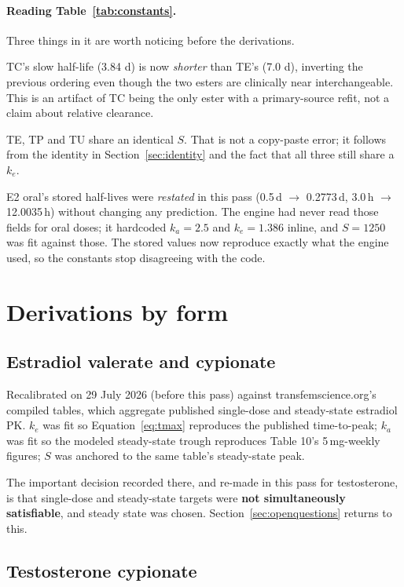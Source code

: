 \documentclass[11pt,a4paper]{article}
\begin{document}
\paragraph{Reading Table~\ref{tab:constants}.} Three things in it are worth
noticing before the derivations.

TC's slow half-life (3.84 d) is now \emph{shorter} than TE's (7.0 d), inverting
the previous ordering even though the two esters are clinically near
interchangeable. This is an artifact of TC being the only ester with a
primary-source refit, not a claim about relative clearance.

TE, TP and TU share an identical $S$. That is not a copy-paste error; it follows
from the identity in Section~\ref{sec:identity} and the fact that all three still
share a $k_e$.

E2 oral's stored half-lives were \emph{restated} in this pass (0.5\,d
$\to$ 0.2773\,d, 3.0\,h $\to$ 12.0035\,h) without changing any prediction. The
engine had never read those fields for oral doses; it hardcoded $k_a = 2.5$ and
$k_e = 1.386$ inline, and $S = 1250$ was fit against those. The stored values now
reproduce exactly what the engine used, so the constants stop disagreeing with the
code.

\section{Derivations by form}

\subsection{Estradiol valerate and cypionate}

Recalibrated on 29 July 2026 (before this pass) against
transfemscience.org's compiled tables, which aggregate published single-dose and
steady-state estradiol PK. $k_e$ was fit so Equation~\ref{eq:tmax} reproduces the
published time-to-peak; $k_a$ was fit so the modeled steady-state trough
reproduces Table 10's 5\,mg-weekly figures; $S$ was anchored to the same table's
steady-state peak.

The important decision recorded there, and re-made in this pass for testosterone,
is that single-dose and steady-state targets were \textbf{not simultaneously
satisfiable}, and steady state was chosen. Section~\ref{sec:openquestions}
returns to this.

\subsection{Testosterone cypionate}
\label{sec:tc}
\end{document}
